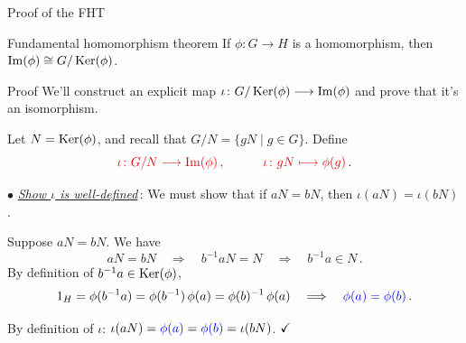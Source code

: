 \documentclass[8pt, handout]{beamer}
\newcommand{\Pause}{}      %
\begin{document}
\begin{frame}{Proof of the FHT}
  
  \begin{block}{Fundamental homomorphism theorem} 
    If $\phi\colon G\to H$ is a homomorphism, then $\operatorname{Im}(\phi)\cong
    G/\operatorname{Ker}(\phi)$.
  \end{block}
  
  \begin{exampleblock}{Proof} \Pause
    We'll construct an explicit map $\iota\colon
    G/\operatorname{Ker}(\phi)\longrightarrow\operatorname{Im}(\phi)$ and prove that it's an
    isomorphism.
    
    \medskip\pause
    
    Let $N=\operatorname{Ker}(\phi)$, and recall that $G/N=\{gN\mid g\in
    G\}$. \Pause Define
    \[
    \Alert{\iota\colon G/N\longrightarrow\Image(\phi)\,,\qquad\quad \iota\colon
      gN\longmapsto\Pause\phi(g)}\,.
    \]
    
    \Pause
    
    \pause $\bullet$ \underline{\emph{Show $\iota$ is well-defined}}\,: \Pause
    We must show that if $aN=bN$, then $\iota(aN)=\iota(bN)$.
    
    \medskip\Pause 
    
    Suppose $aN=bN$. \Pause We have
    \[
    aN=bN \quad\Longrightarrow\quad\Pause b^{-1}aN=N
    \quad\Longrightarrow\quad\Pause b^{-1}a\in N\,.\Pause
    \]
    \pause By definition of $b^{-1}a\in\operatorname{Ker}(\phi)$,%
    \[
    1_H=\phi(b^{-1}a)\Pause=\phi(b^{-1})\,\phi(a)\Pause
    =\phi(b)^{-1}\,\phi(a)\Pause\quad\Longrightarrow\quad
    {\color{blue}\phi(a)=\phi(b)}\,.
    \]
    
    \Pause
    
    By definition of $\iota$:\quad
    $\iota(aN)={\color{blue}\phi(a)}\Pause={\color{blue}\phi(b)}\Pause
    =\iota(bN)$. $\hfill\checkmark$
  \end{exampleblock}

\end{frame}

\end{document}
